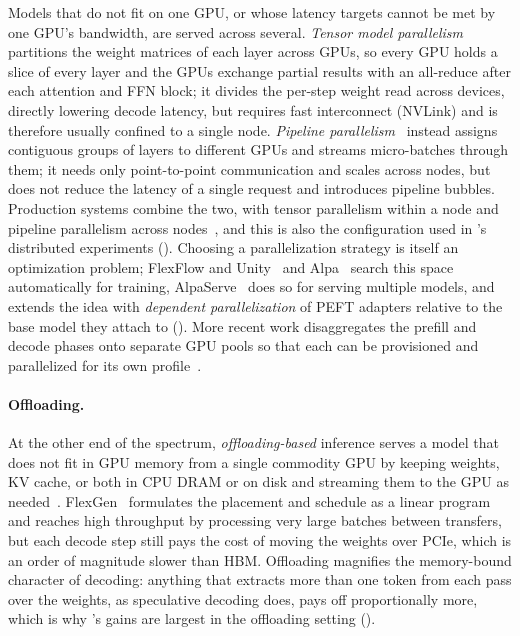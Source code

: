 Models that do not fit on one GPU, or whose latency targets cannot be met by one GPU's bandwidth, are served across several.
\emph{Tensor model parallelism}~\cite{shoeybi2020megatronlm} partitions the weight matrices of each layer across GPUs, so every GPU holds a slice of every layer and the GPUs exchange partial results with an all-reduce after each attention and FFN block; it divides the per-step weight read across devices, directly lowering decode latency, but requires fast interconnect (NVLink) and is therefore usually confined to a single node.
\emph{Pipeline parallelism}~\cite{huang2019gpipe} instead assigns contiguous groups of layers to different GPUs and streams micro-batches through them; it needs only point-to-point communication and scales across nodes, but does not reduce the latency of a single request and introduces pipeline bubbles.
Production systems combine the two, with tensor parallelism within a node and pipeline parallelism across nodes~\cite{aminabadi2022deepspeed,tensorrt-llm}, and this is also the configuration used in \SpecInfer's distributed experiments ().
Choosing a parallelization strategy is itself an optimization problem; FlexFlow and Unity~\cite{jia2019flexflow,unger2022unity} and Alpa~\cite{zheng22-alpa} search this space automatically for training, AlpaServe~\cite{li2023alpaserve} does so for serving multiple models, and \FlexLLM extends the idea with \emph{dependent parallelization} of PEFT adapters relative to the base model they attach to ().
More recent work disaggregates the prefill and decode phases onto separate GPU pools so that each can be provisioned and parallelized for its own profile~\cite{zhong2024distserve,patel2024splitwise}.

\paragraph{Offloading.}
At the other end of the spectrum, \emph{offloading-based} inference serves a model that does not fit in GPU memory from a single commodity GPU by keeping weights, KV cache, or both in CPU DRAM or on disk and streaming them to the GPU as needed~\cite{sheng2023flexgen,aminabadi2022deepspeed}.
FlexGen~\cite{sheng2023flexgen} formulates the placement and schedule as a linear program and reaches high throughput by processing very large batches between transfers, but each decode step still pays the cost of moving the weights over PCIe, which is an order of magnitude slower than HBM.
Offloading magnifies the memory-bound character of decoding: anything that extracts more than one token from each pass over the weights, as speculative decoding does, pays off proportionally more, which is why \SpecInfer's gains are largest in the offloading setting ().

